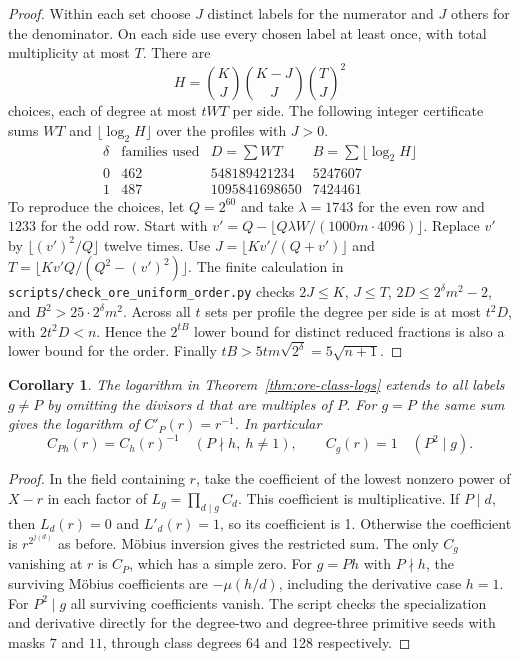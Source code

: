 \documentclass[11pt]{article}
\newtheorem{corollary}[theorem]{Corollary}
\begin{document}
\begin{proof}
Within each set choose \(J\) distinct labels for the numerator and \(J\)
others for the denominator. On each side use every chosen label at least
once, with total multiplicity at most \(T\). There are
\[
             H={K\choose J}{K-J\choose J}{T\choose J}^2
\]
choices, each of degree at most \(tWT\) per side.
The following integer certificate sums \(WT\) and
\(\lfloor\log_2 H\rfloor\) over the profiles with \(J>0\).
\[
\begin{array}{c|r|r|r}
\delta &\text{families used}&D=\sum WT&B=\sum\lfloor\log_2 H\rfloor\\\hline
0&462&548189421234&5247607\\
1&487&1095841698650&7424461
\end{array}
\]
To reproduce the choices, let \(Q=2^{60}\) and take
\(\lambda=1743\) for the even row and \(1233\) for the odd row.
Start with \(v'=Q-\lfloor Q\lambda W/(1000m\cdot4096)\rfloor\).
Replace \(v'\) by \(\lfloor(v')^2/Q\rfloor\) twelve times. Use
\(J=\lfloor Kv'/(Q+v')\rfloor\) and
\(T=\lfloor Kv'Q/(Q^2-(v')^2)\rfloor\).
The finite calculation in \nolinkurl{scripts/check_ore_uniform_order.py}
checks \(2J\le K\), \(J\le T\), \(2D\le2^\delta m^2-2\), and
\(B^2>25\cdot2^\delta m^2\).
Across all \(t\) sets per profile the degree per side is at most
\(t^2D\), with \(2t^2D<n\). Hence the \(2^{tB}\) lower bound for
distinct reduced fractions is also a lower bound for the order.
Finally \(tB>5t m\sqrt{2^\delta}=5\sqrt{n+1}\).
\end{proof}

\begin{corollary}
The logarithm in Theorem~\ref{thm:ore-class-logs} extends to all
labels \(g\ne P\) by omitting the divisors \(d\) that are multiples
of \(P\). For \(g=P\) the same sum gives the logarithm of
\(C'_P(r)=r^{-1}\). In particular
\[
 C_{Ph}(r)=C_h(r)^{-1}\quad(P\nmid h,\ h\ne1),\qquad
 C_g(r)=1\quad(P^2\mid g).
\]
\end{corollary}
\begin{proof}
In the field containing \(r\), take the coefficient of the lowest
nonzero power of \(X-r\) in each factor of
\(L_g=\prod_{d\mid g}C_d\). This coefficient is multiplicative.
If \(P\mid d\), then \(L_d(r)=0\) and \(L'_d(r)=1\), so its coefficient
is 1. Otherwise the coefficient is \(r^{2^{j(d)}}\) as before.
Möbius inversion gives the restricted sum. The only \(C_g\) vanishing
at \(r\) is \(C_P\), which has a simple zero.
For \(g=Ph\) with \(P\nmid h\), the surviving Möbius coefficients are
\(-\mu(h/d)\), including the derivative case \(h=1\). For \(P^2\mid g\)
all surviving coefficients vanish. The script checks the specialization
and derivative directly for the degree-two and degree-three primitive
seeds with masks \(7\) and \(11\), through class degrees 64 and 128
respectively.
\end{proof}
\end{document}
